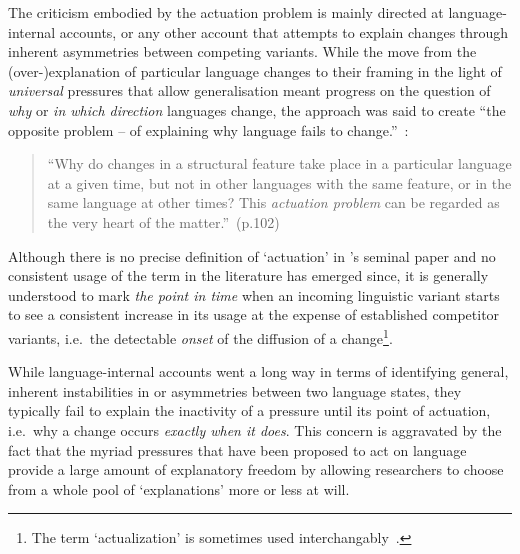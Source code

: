 The criticism embodied by the actuation problem is mainly directed at language-internal accounts, or any other account that attempts to explain changes through inherent asymmetries between competing variants.
While the move from the (over-)explanation of particular language changes to their framing in the light of \emph{universal} pressures that allow generalisation meant progress on the question of \emph{why} or \emph{in which direction} languages change, the approach was said to create ``the opposite problem -- of explaining why language fails to change.''~\citep[p.112]{Weinreich1968}:

\begin{quote}
``Why do changes in a structural feature take place in a particular language at a given time, but not in other languages with the same feature, or in the same language at other times? This \emph{actuation problem} can be regarded as the very heart of the matter.''~(p.102)
\end{quote}

Although there is no precise definition of `actuation' in \citeauthor{Weinreich1968}'s seminal paper and no consistent usage of the term in the literature has emerged since, it is generally understood to mark \emph{the point in time} when an incoming linguistic variant starts to see a consistent increase in its usage at the expense of established competitor variants, i.e.~the detectable \emph{onset} of the diffusion of a change\footnote{The term `actualization' \citep[with a specific meaning in grammaticalisation theory, see][p.24]{Traugott2011} is sometimes used interchangably~\citep{Andersen2008,Kiparsky2014}.}.


While language-internal accounts went a long way in terms of identifying general, inherent instabilities in or asymmetries between two language states, they typically fail to explain the inactivity of a pressure until its point of actuation, i.e.~why a change occurs \emph{exactly when it does}. %
This concern is aggravated by the fact that the myriad pressures that have been proposed to act on language provide a large amount of explanatory freedom by allowing researchers to choose from a whole pool of `explanations' more or less at will.

